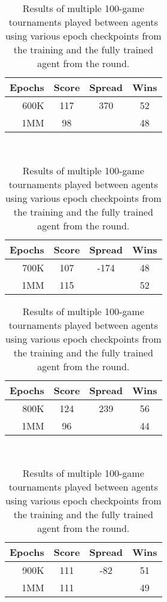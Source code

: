 \begin{table}
\begin{tabular}{|r|c|c|c|}
	\hline
	\textbf{Epochs} & \textbf{Score} & \textbf{Spread} & \textbf{Wins}
	\\\hline
	600K & 117 & 370 & 52
	\\\hline
	1MM & 98 & \textemdash & 48
	\\\hline
\end{tabular}
~
\begin{tabular}{|r|c|c|c|}
	\hline
	\textbf{Epochs} & \textbf{Score} & \textbf{Spread} & \textbf{Wins}
	\\\hline
	700K & 107 & -174 & 48
	\\\hline
	1MM & 115 & \textemdash & 52
	\\\hline
\end{tabular}

\begin{tabular}{|r|c|c|c|}
	\hline
	\textbf{Epochs} & \textbf{Score} & \textbf{Spread} & \textbf{Wins}
	\\\hline
	800K & 124 & 239 & 56
	\\\hline
	1MM & 96 & \textemdash & 44
	\\\hline
\end{tabular}
~
\begin{tabular}{|r|c|c|c|}
	\hline
	\textbf{Epochs} & \textbf{Score} & \textbf{Spread} & \textbf{Wins}
	\\\hline
	900K & 111 & -82 & 51
	\\\hline
	1MM & 111 & \textemdash & 49
	\\\hline
\end{tabular}


\caption{
	Results of multiple 100-game tournaments played between
	agents using various epoch checkpoints from the training
	and the fully trained agent from the round.
}

\label{tab_r1-selftourny}

\end{table}
